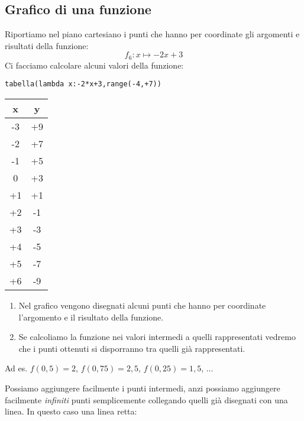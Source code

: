 \subsection{Grafico di una funzione}

Riportiamo nel piano cartesiano i punti che hanno per coordinate gli 
argomenti e risultati della funzione: 
$$f_6: x \mapsto -2x+3$$ 
Ci facciamo calcolare alcuni valori della funzione:

\begin{minipage}{.49\textwidth}
\begin{lstlisting}
tabella(lambda x:-2*x+3,range(-4,+7))
\end{lstlisting}
\begin{center}
\begin{tabular}{c|c}
x & y\\\hline
-3 & +9\\
-2 & +7\\
-1 & +5\\
0 & +3\\
+1 & +1\\
+2 & -1\\
+3 & -3\\
+4 & -5\\
+5 & -7\\
+6 & -9
\end{tabular}
\end{center}
\end{minipage}
\begin{minipage}{.49\textwidth}
\begin{center} \scalebox{.7}{\graficoa} \end{center}
\end{minipage}

\begin{minipage}{.49\textwidth}
\begin{osservazione}
\begin{enumerate}
\item Nel grafico vengono disegnati alcuni punti che hanno per coordinate 
l'argomento e il risultato della funzione.
\item Se calcoliamo la funzione nei valori intermedi a quelli rappresentati 
vedremo che i punti ottenuti si disporranno tra quelli già rappresentati. 
\end{enumerate}
\end{osservazione}

Ad es. 
$f(0,5)=2$, $f(0,75)=2,5$, $f(0,25)=1,5$, ...

Possiamo aggiungere facilmente i punti intermedi, anzi possiamo aggiungere 
facilmente \emph{infiniti} punti semplicemente collegando quelli già 
disegnati con una linea. In questo caso una linea retta:
\end{minipage}
\begin{minipage}{.49\textwidth}
\begin{center} \scalebox{.7}{\graficob} \end{center}
\end{minipage}

